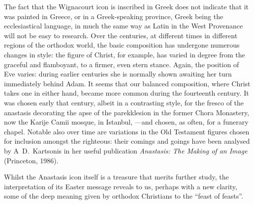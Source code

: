 \documentclass[a4paper,12pt]{article}
\begin{document}
The fact that the Wignacourt icon is inscribed in Greek does not
indicate that it was painted in Greece, or in a Greek-speaking
province, Greek being the ecclesiastical language, in much the same
way as Latin in the West Provenance will not be easy to research.
Over the centuries, at different times in different regions of the
orthodox world, the basic composition has undergone numerous changes
in style: the figure of Christ, for example, has varied in degree from
the graceful and flamboyant, to a firmer, even stern stance.  Again,
the position of Eve varies: during earlier centuries she is normally
shown awaiting her turn immediately behind Adam.  It seems that our
balanced composition, where Christ takes one in either hand, became
more common during the fourteenth century.  It was chosen early that
century, albeit in a contrasting style, for the fresco of the
anastasis decorating the apse of the parekklesion in the former Chora
Monastery, now the Karije Camii mosque, in Istanbul, ---and chosen, as
often, for a funerary chapel.  Notable also over time are variations
in the Old Testament figures chosen for inclusion amongst the
righteous: their comings and goings have been analysed by
A~D.~Kartsonis in her useful publication {\it Anastasis: The Making of
  an Image} (Princeton, 1986).

Whilst the Anastasis icon itself is a treasure that merits further
study, the interpretation of its Easter message reveals to us, perhaps
with a new clarity, some of the deep meaning given by orthodox
Christians to the ``feast of feasts''.
\end{document}
